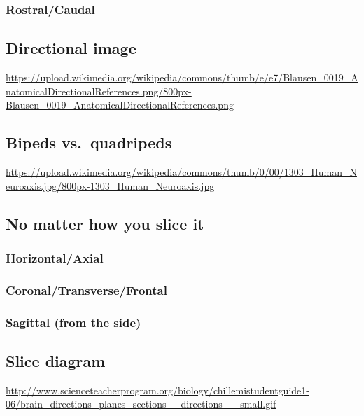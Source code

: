 \documentclass[]{article}
\begin{document}
\subsubsection{Rostral/Caudal}\label{rostralcaudal}

\subsection{Directional image}\label{directional-image}

\url{https://upload.wikimedia.org/wikipedia/commons/thumb/e/e7/Blausen_0019_AnatomicalDirectionalReferences.png/800px-Blausen_0019_AnatomicalDirectionalReferences.png}

\subsection{Bipeds vs.~quadripeds}\label{bipeds-vs.quadripeds}

\url{https://upload.wikimedia.org/wikipedia/commons/thumb/0/00/1303_Human_Neuroaxis.jpg/800px-1303_Human_Neuroaxis.jpg}

\subsection{No matter how you slice
it}\label{no-matter-how-you-slice-it}

\subsubsection{Horizontal/Axial}\label{horizontalaxial}

\subsubsection{Coronal/Transverse/Frontal}\label{coronaltransversefrontal}

\subsubsection{Sagittal (from the side)}\label{sagittal-from-the-side}

\subsection{Slice diagram}\label{slice-diagram}

\url{http://www.scienceteacherprogram.org/biology/chillemistudentguide1-06/brain_directions_planes_sections__directions_-_small.gif}
\end{document}
